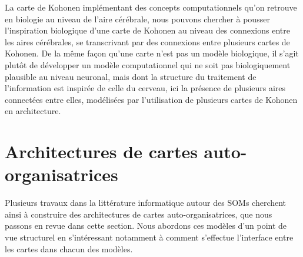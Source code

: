 \documentclass[../main]{subfiles}
\begin{document}
La carte de Kohonen implémentant des concepts computationnels qu'on retrouve en biologie au niveau de l'aire cérébrale, nous pouvons chercher à pousser l'inspiration biologique d'une carte de Kohonen au niveau des connexions entre les aires cérébrales, se transcrivant par des connexions entre plusieurs cartes de Kohonen.
De la même façon qu'une carte n'est pas un modèle biologique, il s'agit plutôt de développer un modèle computationnel qui ne soit pas biologiquement plausible au niveau neuronal, mais dont la structure du traitement de l'information est inspirée de celle du cerveau, ici la présence de plusieurs aires connectées entre elles, modélisées par l'utilisation de plusieurs cartes de Kohonen en architecture.

\section{Architectures de cartes auto-organisatrices}

Plusieurs travaux dans la littérature informatique autour des SOMs cherchent ainsi à construire des architectures de cartes auto-organisatrices, que nous passons en revue dans cette section.
Nous abordons ces modèles d'un point de vue structurel en s'intéressant notamment à comment s'effectue l'interface entre les cartes dans chacun des modèles.
\end{document}
